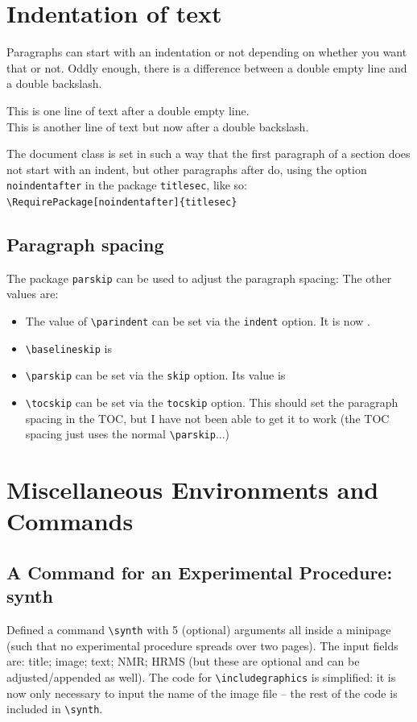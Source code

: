 \documentclass[main_brownies.tex]{subfiles}
\begin{document}
\section{Indentation of text}
Paragraphs can start with an indentation or not depending on whether you want that or not. Oddly enough, there is a difference between a double empty line and a double backslash.

This is one line of text after a double empty line.\\
This is another line of text but now after a double backslash.

The document class is set in such a way that the first paragraph of a section does not start with an indent, but other paragraphs after do, using the option \verb*|noindentafter| in the package \verb*|titlesec|, like so:
\verb*|\RequirePackage[noindentafter]{titlesec}|

\subsection{Paragraph spacing}
The package \verb|parskip| can be used to adjust the paragraph spacing:  The other values are:
\begin{itemize}
	\item The value of \verb|\parindent| can be set via the \texttt{indent} option. It is now \texttt{\the\parindent}.
	\item \verb|\baselineskip| is \texttt{\the\baselineskip}
	\item \verb|\parskip| can be set via the \texttt{skip} option. Its value is \texttt{\the\parskip}
	\item \verb|\tocskip| can be set via the \texttt{tocskip} option. This should set the paragraph spacing in the TOC, but I have not been able to get it to work (the TOC spacing just uses the normal \verb|\parskip|...)
\end{itemize}

\section{Miscellaneous Environments and Commands}
\subsection{A Command for an Experimental Procedure: synth}
Defined a command \verb*|\synth| with 5 (optional) arguments all inside a minipage (such that no experimental procedure spreads over two pages). The input fields are: title; image; text; NMR; HRMS (but these are optional and can be adjusted/appended as well).
The code for \verb*|\includegraphics| is simplified: it is now only necessary to input the name of the image file -- the rest of the code is included in \verb*|\synth|.
\end{document}
